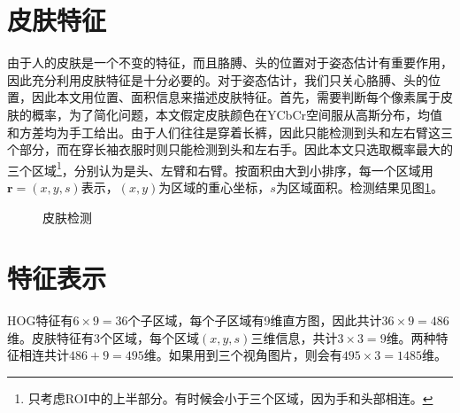 \section{皮肤特征}
由于人的皮肤是一个不变的特征，而且胳膊、头的位置对于姿态估计有重要作用，因此充分利用皮肤特征是十分必要的。对于姿态估计，我们只关心胳膊、头的位置，因此本文用位置、面积信息来描述皮肤特征。首先，需要判断每个像素属于皮肤的概率，为了简化问题，本文假定皮肤颜色在YCbCr空间服从高斯分布，均值和方差均为手工给出。由于人们往往是穿着长裤，因此只能检测到头和左右臂这三个部分，而在穿长袖衣服时则只能检测到头和左右手。因此本文只选取概率最大的三个区域\footnote{只考虑ROI中的上半部分。有时候会小于三个区域，因为手和头部相连。}，分别认为是头、左臂和右臂。按面积由大到小排序，每一个区域用$\mathbf{r}=(x,y,s)$表示，$(x,y)$为区域的重心坐标，$s$为区域面积。检测结果见图\ref{fig:skin}。
\begin{figure}[htbp]
  \centering
  \caption{皮肤检测}\label{fig:skin}
\end{figure}

\section{特征表示}
\label{sec:feature}
HOG特征有$6\times 9=36$个子区域，每个子区域有9维直方图，因此共计$36\times 9=486$维。皮肤特征有3个区域，每个区域$(x,y,s)$三维信息，共计$3\times 3=9$维。两种特征相连共计$486+9=495$维。如果用到三个视角图片，则会有$495\times 3=1485$维。

